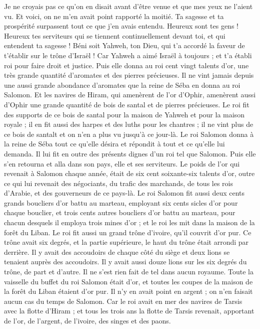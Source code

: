 \begin{multicols}{2}
Je ne croyais pas ce qu’on en disait avant d’être venue et que mes yeux ne l'aient vu. Et voici, on ne m'en avait point rapporté la moitié. Ta sagesse et ta prospérité surpassent tout ce que j'en avais entendu.
Heureux sont tes gens ! Heureux tes serviteurs qui se tiennent continuellement devant toi, et qui entendent ta sagesse !
Béni soit Yahweh, ton Dieu, qui t’a accordé la faveur de t’établir sur le trône d'Israël ! Car Yahweh a aimé Israël à toujours ; et t'a établi roi pour faire droit et justice.
Puis elle donna au roi cent vingt talents d'or, une très grande quantité d’aromates et des pierres précieuses. Il ne vint jamais depuis une aussi grande abondance d’aromates que la reine de Séba en donna au roi Salomon.
Et les navires de Hiram, qui amenèrent de l'or d'Ophir, amenèrent aussi d’Ophir une grande quantité de bois de santal et de pierres précieuses.
Le roi fit des supports de ce bois de santal pour la maison de Yahweh et pour la maison royale ; il en fit aussi des harpes et des luths pour les chantres ; il ne vint plus de ce bois de santalt et on n’en a plus vu jusqu'à ce jour-là.
Le roi Salomon donna à la reine de Séba tout ce qu'elle désira et répondit à tout et ce qu'elle lui demanda. Il lui fit en outre des présents dignes d'un roi tel que Salomon. Puis elle s'en retourna et alla dans son pays, elle et ses serviteurs.
Le poids de l'or qui revenait à Salomon chaque année, était de six cent soixante-six talents d'or,
outre ce qui lui revenait des négociants, du trafic des marchands, de tous les rois d'Arabie, et des gouverneurs de ce pays-là.
Le roi Salomon fit aussi deux cents grands boucliers d'or battu au marteau, employant six cents sicles d'or pour chaque bouclier,
et trois cents autres boucliers d'or battu au marteau, pour chacun desquels il employa trois mines d'or ; et le roi les mit dans la maison de la forêt du Liban.
Le roi fit aussi un grand trône d'ivoire, qu'il couvrit d’or pur.
Ce trône avait six degrés, et la partie supérieure, le haut du trône était arrondi par derrière. Il y avait des accoudoirs de chaque côté du siège et deux lions se tenaient auprès des accoudoirs.
Il y avait aussi douze lions sur les six degrés du trône, de part et d'autre. Il ne s'est rien fait de tel dans aucun royaume.
Toute la vaisselle du buffet du roi Salomon était d'or, et toutes les coupes de la maison de la forêt du Liban étaient d’or pur. Il n'y en avait point en argent ; on n’en faisait aucun cas du temps de Salomon.
Car le roi avait en mer des navires de Tarsis avec la flotte d'Hiram ; et tous les trois ans la flotte de Tarsis revenait, apportant de l'or, de l'argent, de l'ivoire, des singes et des paons.

\end{multicols}
